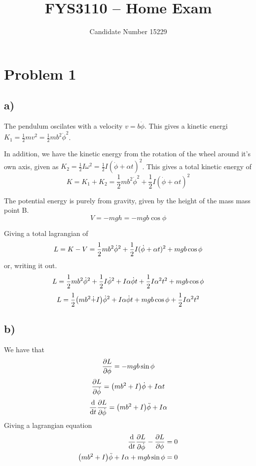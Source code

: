 \documentclass[12p,a4paper]{article}
\newcommand{\half}{\frac{1}{2}}
\begin{document}
\title{FYS3110 -- Home Exam}
\author{
    \begin{tabular}{r l}
        Candidate Number 15229
    \end{tabular}}

\maketitle

\section*{Problem 1}
\subsection*{a)}
The pendulum oscilates with a velocity $v = b\dot{\phi}$. This gives a kinetic energi $K_1 = \half m v^2 = \half m b^2\dot{\phi}^2$.

In addition, we have the kinetic energy from the rotation of the wheel around it's own axis, given as $K_2 = \half I\omega^2 = \half I (\dot{\phi} + \alpha t)^2$. This gives a total kinetic energy of
\[
    K = K_1 + K_2 = \half m b^2\dot{\phi}^2 + \half I(\dot{\phi} + \alpha t)^2
\]

The potential energy is purely from gravity, given by the height of the mass mass point B.
\[
    V = -mgh = -mgb\cos{\phi}
\]

Giving a total lagrangian of 
\[
    L = K - V = \half m b^2\dot{\phi}^2 + \half I(\dot{\phi} + \alpha t)^2 + mgb\cos{\phi} \\ \\
\]
or, writing it out.
\begin{equation*}
    L = \half m b^2\dot{\phi}^2 + \half I \dot{\phi}^2 + I\alpha\dot{\phi}t + \half I \alpha^2 t^2 + mgb\cos{\phi} \\
\end{equation*}
\begin{equation}\label{eqn:Lagr}
    L = \half \qty(m b^2\dot + I)\dot{\phi}^2 + I\alpha\dot{\phi}t + mgb\cos{\phi} + \half I \alpha^2 t^2
\end{equation}

\subsection*{b)}
We have that
\[
    \pdv{L}{\phi} = -mgb\sin{\phi}
\]
\[
    \pdv{L}{\dot{\phi}} = \qty(mb^2 + I)\dot{\phi} + I \alpha t
\]
\[
    \dv{t}\pdv{L}{\dot{\phi}} = \qty(mb^2 + I)\ddot{\phi} + I\alpha
\]
Giving a lagrangian equation
\begin{align*}
    \dv{t}\pdv{L}{\dot{\phi}} - \pdv{L}{\phi} = 0 \\
    \qty(mb^2 + I)\ddot{\phi} + I\alpha + mgb\sin{\phi} = 0
\end{align*}
\end{document}
